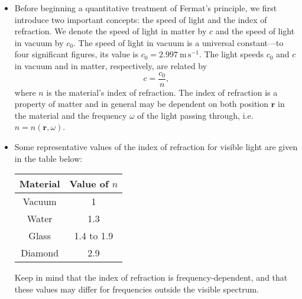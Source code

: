 \documentclass[11pt, a4paper]{article}
\renewcommand{\vec}[1]{\bm{#1}} %
\renewcommand{\r}{\vec{r}}  %
\begin{document}
\begin{itemize}

    \item Before beginning a quantitative treatment of Fermat's principle, we first introduce two important concepts: the speed of light and the index of refraction. We denote the speed of light in matter by $ c $ and the speed of light in vacuum by $ c_{0} $. The speed of light in vacuum is a universal constant---to four significant figures, its value is $ c_{0} = \SI{2.997}{\meter \, \second^{-1}} $. The light speeds $ c_{0} $ and $ c $ in vacuum and in matter, respectively, are related by
    \begin{equation*}
        c = \frac{c_{0}}{n},
    \end{equation*}
    where $ n $ is the material's index of refraction. The index of refraction is a property of matter and in general may be dependent on both position $ \r $ in the material and the frequency $ \omega $ of the light passing through, i.e. $ n = n(\r, \omega) $. 

    \item Some representative values of the index of refraction for visible light are given in the table below:
    \begin{center}
        \begin{tabular}{c|c}
            Material & Value of $ n $ \\
            \hline
            Vacuum & 1\\
            Water & 1.3\\
            Glass & 1.4 to 1.9\\
            Diamond & 2.9
        \end{tabular}
    \end{center}
    Keep in mind that the index of refraction is frequency-dependent, and that these values may differ for frequencies outside the visible spectrum.

\end{itemize}
\end{document}
